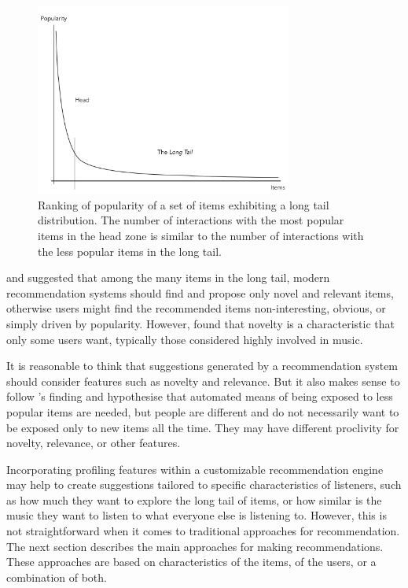 \begin{figure}[!t]
\vspace{1em}
\centering
\includegraphics[width = 0.75\textwidth]{long_tail.pdf}
\caption[Ranking of popularity of a set of items exhibiting a long tail distribution]{Ranking of popularity of a set of items exhibiting a long tail distribution. The number of interactions with the most popular items in the head zone is similar to the number of interactions with the less popular items in the long tail.}
\label{fig:long_tail}
\end{figure}

\textcite{celma10music} and  \textcite{celma11tutorial} suggested that among the many items in the long tail, modern recommendation systems should find and propose only novel and relevant items, otherwise users might find the recommended items non-interesting,  obvious, or simply driven by popularity. 
However, \textcite{bogt11moved} found that novelty is a characteristic that only some users want, typically those considered highly involved in music. 

It is reasonable to think that suggestions generated by a recommendation system should consider features such as novelty and relevance. But it also makes sense to follow \citeauthor{bogt11moved}'s finding and hypothesise that 
automated means of being exposed to less popular items are needed, but people are different and do not necessarily want to be exposed only to new items all the time. They may have different proclivity  for novelty, relevance, or other features. 

Incorporating profiling features within a customizable recommendation engine may help to create suggestions tailored to specific characteristics of listeners, such as how much they want to explore the long tail of items, or how similar is the music they want to listen to what everyone else is listening to. However, this is not straightforward when it comes to traditional approaches for recommendation.
The next section describes the main approaches for making recommendations. These approaches are based on characteristics of the items, of the users, or a combination of both.








